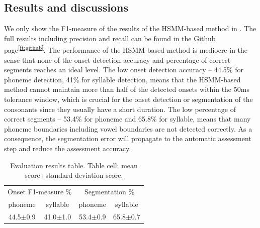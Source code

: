 \subsection{Results and discussions}\label{sec:ch5:results_hsmm}

We only show the F1-measure of the results of the HSMM-based method in . The full results including precision and recall can be found in the Github page\textsuperscript{\ref{ft:github}}. The performance of the HSMM-based method is mediocre in the sense that none of the onset detection accuracy and percentage of correct segments reaches an ideal level. The low onset detection accuracy -- 44.5\% for phoneme detection, 41\% for syllable detection, means that the HSMM-based method cannot maintain more than half of the detected onsets within the 50ms tolerance window, which is crucial for the onset detection or segmentation of the consonants since they usually have a short duration. The low percentage of correct segments -- 53.4\% for phoneme and 65.8\% for syllable, means that many phoneme boundaries including vowel boundaries are not detected correctly. As a consequence, the segmentation error will propagate to the automatic assessment step and reduce the assessment accuracy. 

\begin{table}[ht]
  \centering
  \caption{Evaluation results table. Table cell: mean score$\pm$standard deviation score.}
  \label{table:ch5:results_hsmm}
  \begin{tabular}{cccc}
    \toprule
        \multicolumn{2}{c}{Onset F1-measure \%} & \multicolumn{2}{c}{Segmentation \%} \\
    phoneme & syllable &  phoneme & syllable \\
    \midrule
    44.5$\pm$0.9 & 41.0$\pm$1.0 & 53.4$\pm$0.9 & 65.8$\pm$0.7 \\
    \bottomrule
  \end{tabular}
\end{table}

